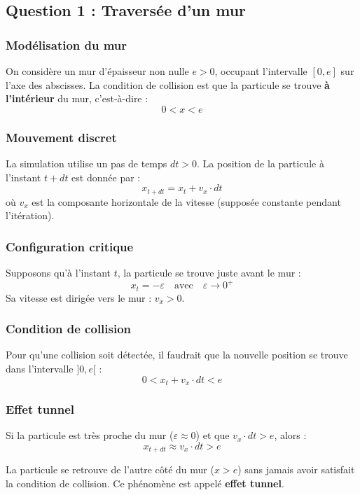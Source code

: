 \documentclass[12pt,a4paper]{report}
\begin{document}
\subsection{Question 1 : Traversée d'un mur}

\subsubsection{Modélisation du mur}

On considère un mur d'épaisseur non nulle $e > 0$, occupant l'intervalle $[0, e]$ sur l'axe des abscisses. La condition de collision est que la particule se trouve \textbf{à l'intérieur} du mur, c'est-à-dire :
\[
0 < x < e
\]

\subsubsection{Mouvement discret}

La simulation utilise un pas de temps $dt > 0$. La position de la particule à l'instant $t+dt$ est donnée par :
\[
x_{t+dt} = x_t + v_x \cdot dt
\]
où $v_x$ est la composante horizontale de la vitesse (supposée constante pendant l'itération).

\subsubsection{Configuration critique}

Supposons qu'à l'instant $t$, la particule se trouve juste avant le mur :
\[
x_t = -\varepsilon \quad \text{avec} \quad \varepsilon \to 0^+
\]
Sa vitesse est dirigée vers le mur : $v_x > 0$.

\subsubsection{Condition de collision}

Pour qu'une collision soit détectée, il faudrait que la nouvelle position se trouve dans l'intervalle $]0, e[$ :
\[
0 < x_t + v_x \cdot dt < e
\]

\subsubsection{Effet tunnel}

Si la particule est très proche du mur ($\varepsilon \approx 0$) et que $v_x \cdot dt > e$, alors :
\[
x_{t+dt} \approx v_x \cdot dt > e
\]

La particule se retrouve de l'autre côté du mur ($x > e$) sans jamais avoir satisfait la condition de collision. Ce phénomène est appelé \textbf{effet tunnel}.
\end{document}
